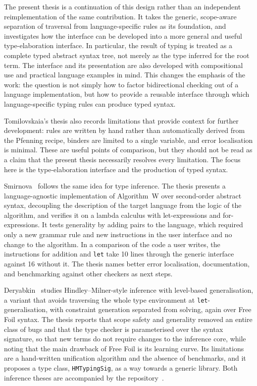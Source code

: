 The present thesis is a continuation of this design rather than an independent reimplementation of the same contribution. It takes the generic, scope-aware separation of traversal from language-specific rules as its foundation, and investigates how the interface can be developed into a more general and useful type-elaboration interface. In particular, the result of typing is treated as a complete typed abstract syntax tree, not merely as the type inferred for the root term. The interface and its presentation are also developed with compositional use and practical language examples in mind. This changes the emphasis of the work: the question is not simply how to factor bidirectional checking out of a language implementation, but how to provide a reusable interface through which language-specific typing rules can produce typed syntax.

Tomilovskaia's thesis also records limitations that provide context for further development: rules are written by hand rather than automatically derived from the Pfenning recipe, binders are limited to a single variable, and error localisation is minimal. These are useful points of comparison, but they should not be read as a claim that the present thesis necessarily resolves every limitation. The focus here is the type-elaboration interface and the production of typed syntax.

Smirnova~\cite{smirnova2025thesis} follows the same idea for type inference. The thesis presents a language-agnostic implementation of Algorithm~W over second-order abstract syntax, decoupling the description of the target language from the logic of the algorithm, and verifies it on a lambda calculus with let-expressions and for-expressions. It tests generality by adding pairs to the language, which required only a new grammar rule and new instructions in the user interface and no change to the algorithm. In a comparison of the code a user writes, the instructions for addition and \texttt{let} take 10 lines through the generic interface against 16 without it. The thesis names better error localisation, documentation, and benchmarking against other checkers as next steps.

Deryabkin~\cite{deryabkin2025hmlevels} studies Hindley--Milner-style inference with level-based generalisation, a variant that avoids traversing the whole type environment at \texttt{let}-generalisation, with constraint generation separated from solving, again over Free Foil syntax. The thesis reports that scope safety and generality removed an entire class of bugs and that the type checker is parameterised over the syntax signature, so that new terms do not require changes to the inference core, while noting that the main drawback of Free Foil is its learning curve. Its limitations are a hand-written unification algorithm and the absence of benchmarks, and it proposes a type class, \texttt{HMTypingSig}, as a way towards a generic library. Both inference theses are accompanied by the repository~\cite{freefoiltypecheck}.

